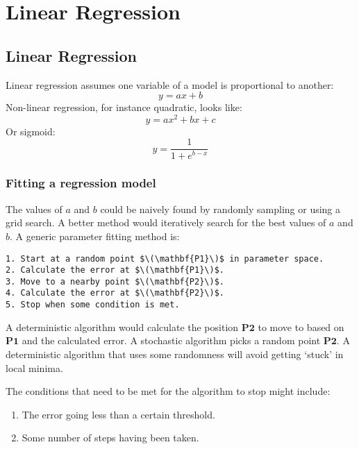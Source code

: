 \chapter{Linear Regression}


\section{Linear Regression}
Linear regression assumes one variable of a model is proportional to another:
\begin{equation}
    \label{eq:linear_regression}
    y = ax + b
\end{equation}
Non-linear regression, for instance quadratic, looks like:
\begin{equation*}
    y = ax^2 + bx + c
\end{equation*}
Or sigmoid:
\begin{equation}
    \label{eq:sigmoid_regression}
    y = \frac{1}{1 + e ^{b-x}}
\end{equation}

\subsection{Fitting a regression model}
The values of \(a\) and \(b\) could be naively found by randomly sampling or using a grid search. A better method would iteratively search for the best values of \(a\) and \(b\). A generic parameter fitting method is:
\begin{lstlisting}
1. Start at a random point $\(\mathbf{P1}\)$ in parameter space.
2. Calculate the error at $\(\mathbf{P1}\)$.
3. Move to a nearby point $\(\mathbf{P2}\)$.
4. Calculate the error at $\(\mathbf{P2}\)$.
5. Stop when some condition is met.
\end{lstlisting}
A deterministic algorithm would calculate the position \(\mathbf{P2}\) to move to based on \(\mathbf{P1}\) and the calculated error. A stochastic algorithm picks a random point \(\mathbf{P2}\). A deterministic algorithm that uses some randomness will avoid getting `stuck' in local minima.

The conditions that need to be met for the algorithm to stop might include:
\begin{enumerate}
    \item The error going less than a certain threshold.
    \item Some number of steps having been taken.
\end{enumerate}

